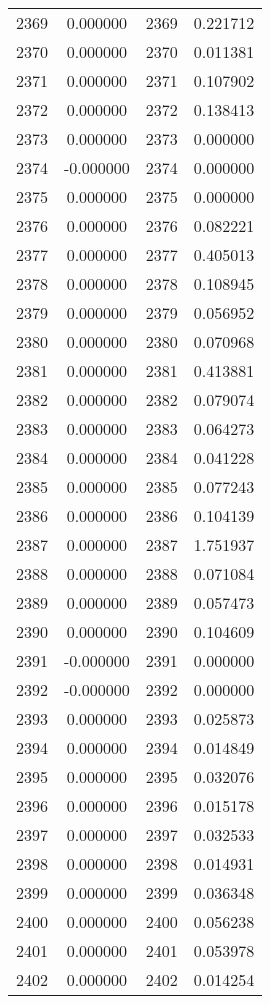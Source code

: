 \documentclass[12pt]{article}
\begin{document}
\begin{longtable}{@{}cccc@{}}
2369 & 0.000000 & 2369 & 0.221712 \\
2370 & 0.000000 & 2370 & 0.011381 \\
2371 & 0.000000 & 2371 & 0.107902 \\
2372 & 0.000000 & 2372 & 0.138413 \\
2373 & 0.000000 & 2373 & 0.000000 \\
2374 & -0.000000 & 2374 & 0.000000 \\
2375 & 0.000000 & 2375 & 0.000000 \\
2376 & 0.000000 & 2376 & 0.082221 \\
2377 & 0.000000 & 2377 & 0.405013 \\
2378 & 0.000000 & 2378 & 0.108945 \\
2379 & 0.000000 & 2379 & 0.056952 \\
2380 & 0.000000 & 2380 & 0.070968 \\
2381 & 0.000000 & 2381 & 0.413881 \\
2382 & 0.000000 & 2382 & 0.079074 \\
2383 & 0.000000 & 2383 & 0.064273 \\
2384 & 0.000000 & 2384 & 0.041228 \\
2385 & 0.000000 & 2385 & 0.077243 \\
2386 & 0.000000 & 2386 & 0.104139 \\
2387 & 0.000000 & 2387 & 1.751937 \\
2388 & 0.000000 & 2388 & 0.071084 \\
2389 & 0.000000 & 2389 & 0.057473 \\
2390 & 0.000000 & 2390 & 0.104609 \\
2391 & -0.000000 & 2391 & 0.000000 \\
2392 & -0.000000 & 2392 & 0.000000 \\
2393 & 0.000000 & 2393 & 0.025873 \\
2394 & 0.000000 & 2394 & 0.014849 \\
2395 & 0.000000 & 2395 & 0.032076 \\
2396 & 0.000000 & 2396 & 0.015178 \\
2397 & 0.000000 & 2397 & 0.032533 \\
2398 & 0.000000 & 2398 & 0.014931 \\
2399 & 0.000000 & 2399 & 0.036348 \\
2400 & 0.000000 & 2400 & 0.056238 \\
2401 & 0.000000 & 2401 & 0.053978 \\
2402 & 0.000000 & 2402 & 0.014254 \\

\end{longtable}
\end{document}
